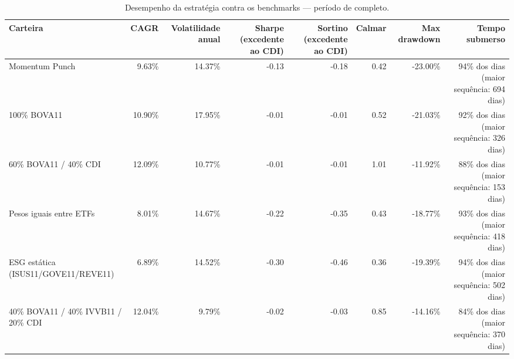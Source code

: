 \begin{table}[htbp]
\centering
\caption{Desempenho da estratégia contra os benchmarks — período de completo.}
\label{tab:performance-completo}
\begin{tabular}{lrrrrrrr}
\toprule
Carteira & CAGR & Volatilidade anual & Sharpe (excedente ao CDI) & Sortino (excedente ao CDI) & Calmar & Max drawdown & Tempo submerso \\
\midrule
Momentum Punch & 9.63\% & 14.37\% & -0.13 & -0.18 & 0.42 & -23.00\% & 94\% dos dias (maior sequência: 694 dias) \\
100\% BOVA11 & 10.90\% & 17.95\% & -0.01 & -0.01 & 0.52 & -21.03\% & 92\% dos dias (maior sequência: 326 dias) \\
60\% BOVA11 / 40\% CDI & 12.09\% & 10.77\% & -0.01 & -0.01 & 1.01 & -11.92\% & 88\% dos dias (maior sequência: 153 dias) \\
Pesos iguais entre ETFs & 8.01\% & 14.67\% & -0.22 & -0.35 & 0.43 & -18.77\% & 93\% dos dias (maior sequência: 418 dias) \\
ESG estática (ISUS11/GOVE11/REVE11) & 6.89\% & 14.52\% & -0.30 & -0.46 & 0.36 & -19.39\% & 94\% dos dias (maior sequência: 502 dias) \\
40\% BOVA11 / 40\% IVVB11 / 20\% CDI & 12.04\% & 9.79\% & -0.02 & -0.03 & 0.85 & -14.16\% & 84\% dos dias (maior sequência: 370 dias) \\
\bottomrule
\end{tabular}
\end{table}
